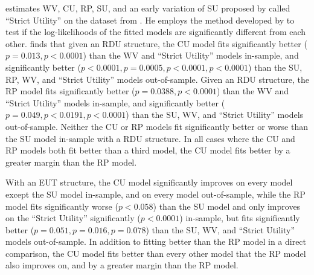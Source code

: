 \documentclass[../main.tex]{subfiles}
\begin{document}
\addtocounter{footnote}{-2}

\textcite{Wilcox2008} estimates WV, CU, RP, SU, and an early variation of SU proposed by \textcite{Luce1958} called \enquote{Strict Utility} on the dataset from \textcite{Hey2001}.
He employs the  method developed by \textcite{Vuong1989} to test if the log-likelihoods of the fitted models are significantly different from each other.
\textcite[273]{Wilcox2008} finds that given an RDU structure, the CU model fits significantly better ($p=0.013,p<0.0001$) than the WV and \enquote{Strict Utility} models in-sample, and significantly better ($p<0.0001, p=0.0005, p<0.0001, p<0.0001$) than the SU, RP, WV, and \enquote{Strict Utility} models out-of-sample.
Given an RDU structure, the RP model fits significantly better ($p=0.0388,p<0.0001$) than the WV and \enquote{Strict Utility} models in-sample, and significantly better ($p=0.049, p<0.0191, p<0.0001$) than the SU, WV, and \enquote{Strict Utility} models out-of-sample.
Neither the CU or RP models fit significantly better or worse than the SU model in-sample with a RDU structure.
In all cases where the CU and RP models both fit better than a third model, the CU model fits better by a greater margin than the RP model.

With an EUT structure, the CU model significantly improves on every model except the SU model in-sample, and on every model out-of-sample, while the RP model fits significantly worse ($p<0.058$) than the SU model and only improves on the \enquote{Strict Utility} significantly ($p<0.0001$) in-sample, but fits significantly better ($p=0.051,p=0.016,p=0.078$) than the SU, WV, and \enquote{Strict Utility} models out-of-sample.
In addition to fitting better than the RP model in a direct comparison, the CU model fits better than every other model that the RP model also improves on, and by a greater margin than the RP model.
\end{document}
